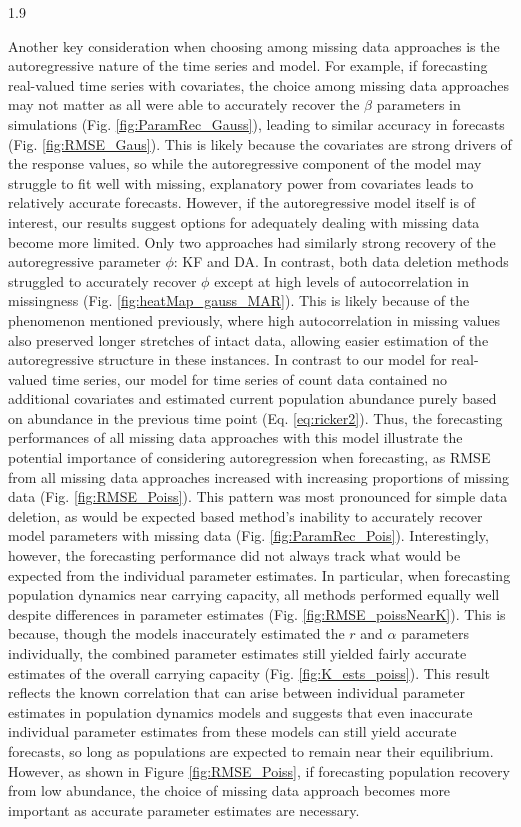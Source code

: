 \documentclass[12pt,english]{article} %
\begin{document}
\begin{linenumbers}
\begin{spacing}{1.9}
\begin{flushleft}
\hspace{1em} Another key consideration when choosing among missing data approaches is the autoregressive nature of the time series and model. For example, if forecasting real-valued time series with covariates, the choice among missing data approaches may not matter as all were able to accurately recover the $\beta$ parameters in simulations (Fig. \ref{fig:ParamRec_Gauss}), leading to similar accuracy in forecasts (Fig. \ref{fig:RMSE_Gaus}). This is likely because the covariates are strong drivers of the response values, so while the autoregressive component of the model may struggle to fit well with missing, explanatory power from covariates leads to relatively accurate forecasts. However, if the autoregressive model itself is of interest, our results suggest options for adequately dealing with missing data become more limited. Only two approaches had similarly strong recovery of the autoregressive parameter $\phi$: KF and DA. In contrast, both data deletion methods struggled to accurately recover $\phi$ except at high levels of autocorrelation in missingness (Fig. \ref{fig:heatMap_gauss_MAR}). This is likely because of the phenomenon mentioned previously, where high autocorrelation in missing values also preserved longer stretches of intact data, allowing easier estimation of the autoregressive structure in these instances. In contrast to our model for real-valued time series, our model for time series of count data contained no additional covariates and estimated current population abundance purely based on abundance in the previous time point (Eq. \ref{eq:ricker2}). Thus, the forecasting performances of all missing data approaches with this model illustrate the potential importance of considering autoregression when forecasting, as RMSE from all missing data approaches increased with increasing proportions of missing data (Fig. \ref{fig:RMSE_Poiss}). This pattern was most pronounced for simple data deletion, as would be expected based method's inability to accurately recover model parameters with missing data (Fig. \ref{fig:ParamRec_Pois}). Interestingly, however, the forecasting performance did not always track what would be expected from the individual parameter estimates. In particular, when forecasting population dynamics near carrying capacity, all methods performed equally well despite differences in parameter estimates (Fig. \ref{fig:RMSE_poissNearK}). This is because, though the models inaccurately estimated the $r$ and $\alpha$ parameters individually, the combined parameter estimates still yielded fairly accurate estimates of the overall carrying capacity (Fig. \ref{fig:K_ests_poiss}). This result reflects the known correlation that can arise between individual parameter estimates in population dynamics models \citep{zhou2007discriminating} and suggests that even inaccurate individual parameter estimates from these models can still yield accurate forecasts, so long as populations are expected to remain near their equilibrium. However, as shown in Figure \ref{fig:RMSE_Poiss}, if forecasting population recovery from low abundance, the choice of missing data approach becomes more important as accurate parameter estimates are necessary.

\end{flushleft}
\end{spacing}
\end{linenumbers}
\end{document}
